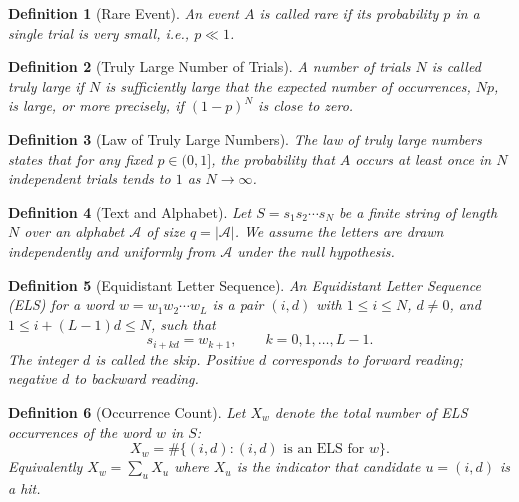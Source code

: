 \documentclass[11pt]{amsart}
\theoremstyle{plain}
\newtheorem{definition}{Definition}
\theoremstyle{remark}
\begin{document}
\begin{definition}[Rare Event]
\label{def:rare}
An event \(A\) is called \emph{rare} if its probability \(p\) in a single
trial is very small, i.e., \(p \ll 1\).
\end{definition}

\begin{definition}[Truly Large Number of Trials]
\label{def:large}
A number of trials \(N\) is called \emph{truly large} if \(N\) is
sufficiently large that the expected number of occurrences, \(Np\), is
large, or more precisely, if \((1-p)^N\) is close to zero.
\end{definition}

\begin{definition}[Law of Truly Large Numbers]
\label{def:law}
The law of truly large numbers states that for any fixed \(p \in (0,1]\),
the probability that \(A\) occurs at least once in \(N\) independent
trials tends to \(1\) as \(N \to \infty\).
\end{definition}

\begin{definition}[Text and Alphabet]
\label{def:text}
Let \(S = s_1 s_2 \cdots s_N\) be a finite string of length \(N\) over an
alphabet \(\mathcal{A}\) of size \(q = |\mathcal{A}|\). We assume the
letters are drawn independently and uniformly from \(\mathcal{A}\) under
the null hypothesis.
\end{definition}

\begin{definition}[Equidistant Letter Sequence]
\label{def:els}
An \emph{Equidistant Letter Sequence} (ELS) for a word
\(w = w_1 w_2 \cdots w_L\) is a pair \((i,d)\) with \(1 \le i \le N\),
\(d \neq 0\), and \(1 \le i + (L-1)d \le N\), such that
\begin{equation}
\label{eq:els-def}
s_{i + k d} = w_{k+1}, \qquad k = 0, 1, \dots, L-1.
\end{equation}
The integer \(d\) is called the \emph{skip}. Positive \(d\) corresponds to
forward reading; negative \(d\) to backward reading.
\end{definition}

\begin{definition}[Occurrence Count]
\label{def:count}
Let \(X_w\) denote the total number of ELS occurrences of the word \(w\)
in \(S\):
\begin{equation}
\label{eq:count}
X_w = \#\{(i,d) : (i,d) \text{ is an ELS for } w\}.
\end{equation}
Equivalently \(X_w = \sum_{u} X_u\) where \(X_u\) is the indicator that
candidate \(u=(i,d)\) is a hit.
\end{definition}
\end{document}
